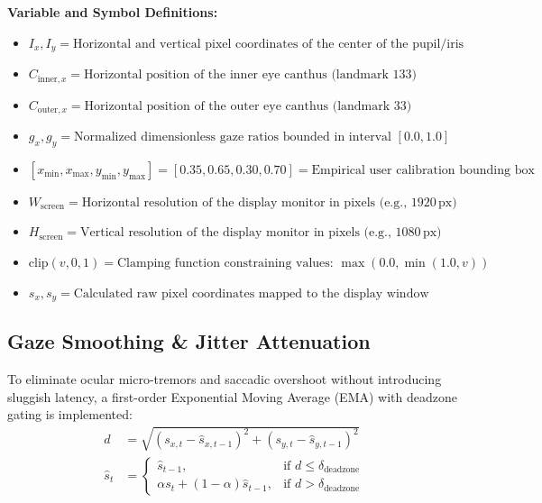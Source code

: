 \documentclass[11pt,a4paper]{article}
\begin{document}
\textbf{Variable and Symbol Definitions:}
\begin{itemize}
    \item $I_x, I_y = \text{Horizontal and vertical pixel coordinates of the center of the pupil/iris (landmarks 468, 473)}$
    \item $C_{\text{inner}, x} = \text{Horizontal position of the inner eye canthus (landmark 133)}$
    \item $C_{\text{outer}, x} = \text{Horizontal position of the outer eye canthus (landmark 33)}$
    \item $g_x, g_y = \text{Normalized dimensionless gaze ratios bounded in interval } [0.0, 1.0]$
    \item $[x_{\min}, x_{\max}, y_{\min}, y_{\max}] = [0.35, 0.65, 0.30, 0.70] = \text{Empirical user calibration bounding box}$
    \item $W_{\text{screen}} = \text{Horizontal resolution of the display monitor in pixels (e.g., } 1920\,\text{px)}$
    \item $H_{\text{screen}} = \text{Vertical resolution of the display monitor in pixels (e.g., } 1080\,\text{px)}$
    \item $\text{clip}(v, 0, 1) = \text{Clamping function constraining values: } \max(0.0, \min(1.0, v))$
    \item $s_x, s_y = \text{Calculated raw pixel coordinates mapped to the display window}$
\end{itemize}

\subsection{Gaze Smoothing \& Jitter Attenuation}
To eliminate ocular micro-tremors and saccadic overshoot without introducing sluggish latency, a first-order Exponential Moving Average (EMA) with deadzone gating is implemented:
\begin{align}
d &= \sqrt{(s_{x, t} - \hat{s}_{x, t-1})^2 + (s_{y, t} - \hat{s}_{y, t-1})^2} \\
\hat{s}_{t} &= 
\begin{cases}
\hat{s}_{t-1}, & \text{if } d \le \delta_{\text{deadzone}} \\
\alpha s_t + (1 - \alpha) \hat{s}_{t-1}, & \text{if } d > \delta_{\text{deadzone}}
\end{cases}
\end{align}
\end{document}
